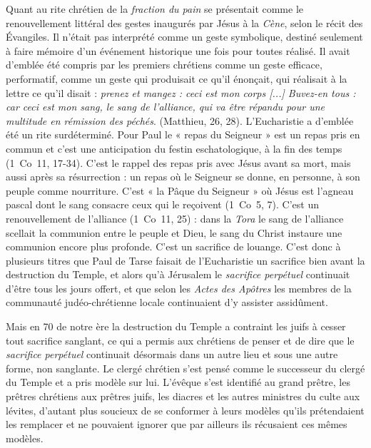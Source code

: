  Quant au rite chrétien de la \emph{fraction du pain} se présentait comme le renouvellement littéral des gestes inaugurés par Jésus à la \emph{Cène}, selon le récit des Évangiles. Il n'était pas interprété comme un geste symbolique, destiné seulement à faire mémoire d'un événement historique une fois pour toutes réalisé. Il avait d'emblée été compris par les premiers chrétiens comme un geste efficace, performatif, comme un geste qui produisait ce qu'il énonçait, qui réalisait à la lettre ce qu'il disait : \emph{prenez et mangez : ceci est mon corps \emph{[...]} Buvez-en tous : car ceci est mon sang, le sang de l'alliance, qui va être répandu pour une multitude en rémission des péchés}. (Matthieu, 26, 28). L'Eucharistie a d'emblée été un rite surdéterminé. Pour Paul le « repas du Seigneur » est un repas pris en commun et c'est une anticipation du festin eschatologique, à la fin des temps (1~Co~11, 17-34). C'est le rappel des repas pris avec Jésus avant sa mort, mais aussi après sa résurrection : un repas où le Seigneur se donne, en personne, à son peuple comme nourriture. C'est « la Pâque du Seigneur » où Jésus est l'agneau pascal dont le sang consacre ceux qui le reçoivent (1~Co~5, 7). C'est un renouvellement de l'alliance (1~Co~11, 25) : dans la \emph{Tora} le sang de l'alliance scellait la communion entre le peuple et Dieu, le sang du Christ instaure une communion encore plus profonde. C'est un sacrifice de louange. C'est donc à plusieurs titres que Paul de Tarse faisait de l'Eucharistie un sacrifice bien avant la destruction du Temple, et alors qu'à Jérusalem le \emph{sacrifice perpétuel} continuait d'être tous les jours offert, et que selon les \emph{Actes des Apôtres} les membres de la communauté judéo-chrétienne locale continuaient d'y assister assidûment.

 Mais en 70 de notre ère la destruction du Temple a contraint les juifs à cesser tout sacrifice sanglant, ce qui a permis aux chrétiens de penser et de dire que le \emph{sacrifice perpétuel} continuait désormais dans un autre lieu et sous une autre forme, non sanglante. Le clergé chrétien s'est pensé comme le successeur du clergé du Temple et a pris modèle sur lui. L'évêque s'est identifié au grand prêtre, les prêtres chrétiens aux prêtres juifs, les diacres et les autres ministres du culte aux lévites, d'autant plus soucieux de se conformer à leurs modèles qu'ils prétendaient les remplacer et ne pouvaient ignorer que par ailleurs ils récusaient ces mêmes modèles.

